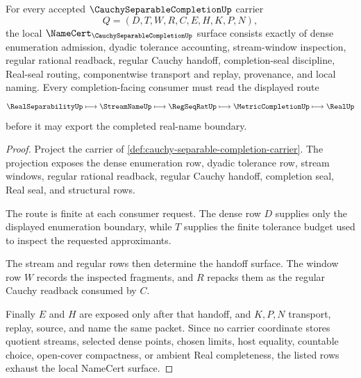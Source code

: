 \begin{theorem}
\label{thm:cauchy-separable-completion-namecert-obligations}
For every accepted $\CauchySeparableCompletionUp$ carrier
$$
Q=(D,T,W,R,C,E,H,K,P,N),
$$
the local $\NameCert_{\CauchySeparableCompletionUp}$ surface consists exactly of dense enumeration admission, dyadic tolerance accounting, stream-window inspection, regular rational readback, regular Cauchy handoff, completion-seal discipline, Real-seal routing, componentwise transport and replay, provenance, and local naming. Every completion-facing consumer must read the displayed route
$$
\RealSeparabilityUp \longmapsto \StreamNameUp \longmapsto \RegSeqRatUp \longmapsto \MetricCompletionUp \longmapsto \RealUp
$$
before it may export the completed real-name boundary.
\end{theorem}
\begin{proof}
Project the carrier of \autoref{def:cauchy-separable-completion-carrier}. The projection exposes the dense enumeration row, dyadic tolerance row, stream windows, regular rational readback, regular Cauchy handoff, completion seal, Real seal, and structural rows.

The route is finite at each consumer request. The dense row $D$ supplies only the displayed enumeration boundary, while $T$ supplies the finite tolerance budget used to inspect the requested approximants.

The stream and regular rows then determine the handoff surface. The window row $W$ records the inspected fragments, and $R$ repacks them as the regular Cauchy readback consumed by $C$.

Finally $E$ and $H$ are exposed only after that handoff, and $K,P,N$ transport, replay, source, and name the same packet. Since no carrier coordinate stores quotient streams, selected dense points, chosen limits, host equality, countable choice, open-cover compactness, or ambient Real completeness, the listed rows exhaust the local NameCert surface.
\end{proof}


